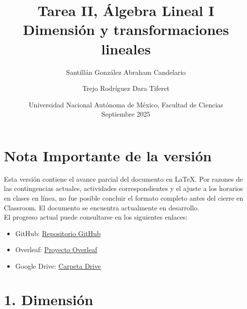 \documentclass{article}
\title{Tarea II, Álgebra Lineal I\\[1ex] Dimensión y transformaciones lineales}
\author{
		Santillán González Abraham Candelario
		\and
		Trejo Rodríguez Dara Tiferet
	}
\date{Universidad Nacional Autónoma de México, Facultad de Ciencias\\[1ex] Septiembre 2025}
\begin{document}
		
		\maketitle
		\newpage
		
		\section*{Nota Importante de la versión}
		
		Esta versión contiene el avance parcial del documento en LaTeX.
		Por razones de las contingencias actuales, actividades correspondientes
		y el ajuste a los horarios en clases en línea,
		no fue posible concluir el formato completo antes del cierre en Classroom.
		El documento se encuentra actualmente en desarrollo. \\ 
		
		El progreso actual puede consultarse en los siguientes enlaces:
		
		\begin{itemize}
			\item GitHub: \href{https://github.com/Cande-Tlanextli/Tarea-lineal-LaTeX.git}{Repositorio GitHub}
			\item Overleaf: \href{https://www.overleaf.com/read/xvcfwkqfjvgx#c1b3df}{Proyecto Overleaf}
			\item Google Drive: \href{https://drive.google.com/drive/folders/1riBnh370KrlFX1c7xBEoZJi1Zb3alMQC?usp=sharing}{Carpeta Drive}
		\end{itemize}
		
		
		
		
		\section*{1. Dimensión}
		
\end{document}
